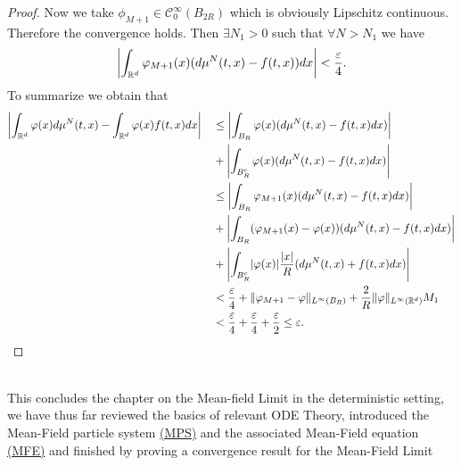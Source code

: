\begin{proof}
  Now we take $\phi_{M+1} \in  \mathcal{C}_0^{\infty}(B_{2R}) $ which is obviously Lipschitz continuous. Therefore the convergence 
  holds. Then $\exists N_{1}>0$ such that $\forall  N > N_{1}$ we have 
  \begin{align*}
    \abs*{\int_{\mathbb{R}^{d} }\phi_{M+1}(x)(d\mu ^{N}(t,x) - f(t,x) )dx}< \frac{\epsilon}{4}
  .\end{align*}
  To summarize we obtain that 
  \begin{alignat*}{3}
    &\abs*{\int_{\mathbb{R}^{d} }\phi(x) d\mu ^{N}(t,x) - \int_{\mathbb{R}^{d} }\phi(x) f(t,x) dx} &&\le \abs*{\int_{B_R }\phi(x)(d\mu ^{N}(t,x) - f(t,x)dx ) } \\
    & &&+\abs*{\int_{B_R^{c} } \phi(x)(d\mu ^{N}(t,x)-f(t,x)dx )}\\
    & &&\le \abs*{\int_{B_R }\phi_{M+1}(x)(d\mu ^{N}(t,x) - f(t,x)dx ) } \\
    & &&+ \abs*{\int_{B_R} (\phi_{M+1}(x)-\phi(x))(d\mu ^{N}(t,x)-f(t,x)dx )}\\
    & &&+ \abs*{\int_{B^{c}_R }\abs{\phi(x)} \frac{\abs{x}}{R}(d\mu ^{N}(t,x) + f(t,x) dx)}\\
    & &&< \frac{\epsilon}{4} + \|\phi_{M+1}-\phi \|_{L^{\infty}(B_R) } + \frac{2}{R}\|\phi \|_{L^{\infty}(\mathbb{R}^{d} ) }M_1\\
    & &&< \frac{\epsilon}{4} +\frac{\epsilon}{4} +\frac{\epsilon}{2} \le \epsilon
  .\end{alignat*}
\end{proof}
\hspace{0mm}\\[3ex]
This concludes the chapter on the Mean-field Limit in the deterministic setting, we have thus far 
reviewed the basics of relevant ODE Theory, introduced the Mean-Field particle system \hyperref[first_order_system]{(MPS)} and the 
associated Mean-Field equation \hyperref[mfe]{(MFE)} and finished by proving a convergence
result for the Mean-Field Limit





































